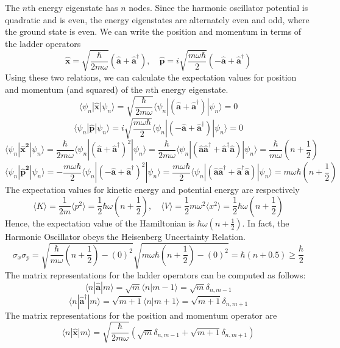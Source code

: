 \documentclass[a4paper]{article}
\begin{document}
The $n$th energy eigenstate has $n$ nodes. Since the harmonic oscillator potential is quadratic and is even, the energy eigenstates are alternately even and odd, where the ground state is even. We can write the position and momentum in terms of the ladder operators
$$\mathbf{\hat{x}}=\sqrt{\frac{\hbar}{2m\omega}}(\mathbf{\hat{a}}+\mathbf{\hat{a}^\dag}),\quad \mathbf{\hat{p}}=i\sqrt{\frac{m\omega\hbar}{2}}(-\mathbf{\hat{a}}+\mathbf{\hat{a}^\dag})
$$
Using these two relations, we can calculate the expectation values for position and momentum (and squared) of the $n$th energy eigenstate. 
$$
\big\langle\psi_n|\mathbf{\hat{x}}|\psi_n\big\rangle=\sqrt{\frac{\hbar}{2m\omega}}\big\langle\psi_n|(\mathbf{\hat{a}}+\mathbf{\hat{a}^\dag})|\psi_n\big\rangle=0
$$
$$
\big\langle\psi_n|\mathbf{\hat{p}}|\psi_n\big\rangle=i\sqrt{\frac{m\omega\hbar}{2}}\big\langle\psi_n|(-\mathbf{\hat{a}}+\mathbf{\hat{a}^\dag})|\psi_n\big\rangle=0
$$
$$
\big\langle\psi_n|\mathbf{\hat{x}^2}|\psi_n\big\rangle=\frac{\hbar}{2m\omega}\big\langle\psi_n|(\mathbf{\hat{a}}+\mathbf{\hat{a}^\dag})^2|\psi_n\big\rangle=\frac{\hbar}{2m\omega}\big\langle\psi_n|(\mathbf{\hat{a}}\mathbf{\hat{a}^\dag}+\mathbf{\hat{a}^\dag}\mathbf{\hat{a}})|\psi_n\big\rangle=\frac{\hbar}{m\omega}(n+\frac{1}{2})$$
$$
\big\langle\psi_n|\mathbf{\hat{p}^2}|\psi_n\big\rangle=-\frac{m\omega\hbar}{2}\big\langle\psi_n|(-\mathbf{\hat{a}}+\mathbf{\hat{a}^\dag})^2|\psi_n\big\rangle=\frac{m\omega\hbar}{2}\big\langle\psi_n|(\mathbf{\hat{a}}\mathbf{\hat{a}^\dag}+\mathbf{\hat{a}^\dag}\mathbf{\hat{a}})|\psi_n\big\rangle=m\omega\hbar(n+\frac{1}{2})$$
The expectation values for kinetic energy  and potential energy are respectively
$$\big\langle K\big\rangle=\frac{1}{2m}\big\langle p^2 \big\rangle=\frac{1}{2}\hbar\omega(n+\frac{1}{2}),\quad\big\langle V\big\rangle=\frac{1}{2}m\omega^2\big\langle x^2 \big\rangle=\frac{1}{2}\hbar\omega(n+\frac{1}{2})$$
Hence, the expectation value of the Hamiltonian is  $\hbar\omega(n+\frac{1}{2})$. In fact, the Harmonic Oscillator obeys the Heisenberg Uncertainty Relation.
$$
\sigma_x\sigma_p=\sqrt{\frac{\hbar}{m\omega}(n+\frac{1}{2})-(0)^2}\sqrt{m\omega\hbar(n+\frac{1}{2})-(0)^2}=\hbar(n+0.5)\geq\frac{\hbar}{2}$$
The matrix representations for the ladder operators can be computed as follows:
$$
\langle n|\mathbf{\hat{a}}|m\rangle=\sqrt{m}\langle n|m-1\rangle=\sqrt{m}\delta_{n,m-1}
$$
$$
\langle n|\mathbf{\hat{a}}^\dag|m\rangle=\sqrt{m+1}\langle n|m+1\rangle=\sqrt{m+1}\delta_{n,m+1}
$$
The matrix representations for the position and momentum operator are
$$
\langle n|\mathbf{\hat{x}}|m\rangle=\sqrt{\frac{\hbar}{2m\omega}}(\sqrt{m}\delta_{n,m-1}+\sqrt{m+1}\delta_{n,m+1})
$$
\end{document}
